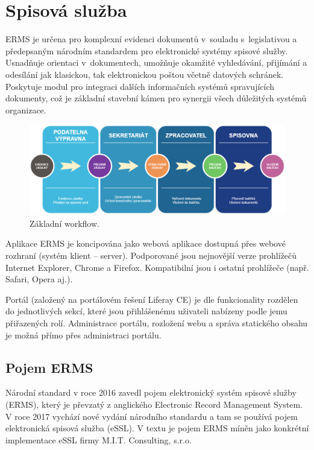 \documentclass[
  master,
  field=ainfp,
  biblatex,
  language=czech,
  glossaries,
  theorems=false,
  index
]{kidiplom}
\begin{document}
\newpage
\section{Spisová služba}
\gls{ERMS} je určena pro komplexní evidenci dokumentů v~souladu s~legislativou a předepsaným národním standardem pro elektronické systémy spisové služby. Usnadňuje orientaci v~dokumentech, umožňuje okamžité vyhledávání, přijímání a odesílání jak klasickou, tak elektronickou poštou včetně datových schránek. Poskytuje modul pro integraci dalších informačních systémů spravujících dokumenty, což je základní stavební kámen pro synergii všech důležitých systémů organizace.

\begin{figure}[h]
  \centerline{\includegraphics[width=0.9\linewidth]{./images/ERMSWorkflow1.png}} 
  \caption{Základní workflow.} 
\end{figure}

Aplikace ERMS je koncipována jako webová aplikace dostupná přes webové rozhraní (systém klient – server). Podporované jsou nejnovější verze prohlížečů Internet Explorer, Chrome a Firefox. Kompatibilní jsou i ostatní prohlížeče (např. Safari, Opera aj.).

Portál (založený na portálovém řešení Liferay CE) je dle funkcionality rozdělen do jednotlivých sekcí, které jsou přihlášenému uživateli nabízeny podle jemu přiřazených rolí. Administrace portálu, rozložení webu a správa statického obsahu je možná přímo přes administraci portálu. 

\subsection{Pojem ERMS}
Národní standard v roce 2016 zavedl pojem elektronický systém spisové služby (ERMS), který je převzatý z anglického Electronic Record Management System. V roce 2017 vychází nové vydání národního standardu a tam se používá pojem elektronická spisová služba (eSSL). V textu je pojem ERMS míněn jako konkrétní implementace eSSL firmy M.I.T. Consulting, s.r.o.
\newpage
\end{document}
